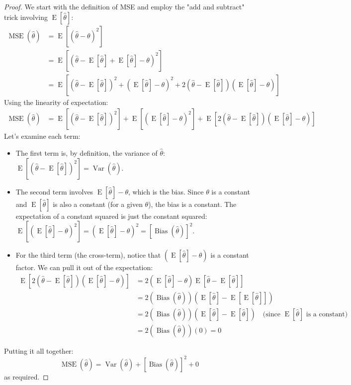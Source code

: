 \documentclass[11pt]{article}
\theoremstyle{mytheoremstyle}
\theoremstyle{mydefinitionstyle}
\DeclareMathOperator{\E}{E}
\DeclareMathOperator{\Var}{Var}
\DeclareMathOperator{\Bias}{Bias}
\DeclareMathOperator{\MSE}{MSE}
\begin{document}
\begin{proof}
We start with the definition of MSE and employ the "add and subtract" trick involving $\E[\hat{\theta}]$:
\begin{align*}
\MSE(\hat{\theta}) &= \E[(\hat{\theta} - \theta)^2] \\
&= \E[(\hat{\theta} - \E[\hat{\theta}] + \E[\hat{\theta}] - \theta)^2] \\
&= \E[ (\hat{\theta} - \E[\hat{\theta}])^2 + (\E[\hat{\theta}] - \theta)^2 + 2 (\hat{\theta} - \E[\hat{\theta}]) (\E[\hat{\theta}] - \theta) ]
\end{align*}
Using the linearity of expectation:
\begin{align*}
\MSE(\hat{\theta}) &= \E[(\hat{\theta} - \E[\hat{\theta}])^2] + \E[(\E[\hat{\theta}] - \theta)^2] + \E[2 (\hat{\theta} - \E[\hat{\theta}]) (\E[\hat{\theta}] - \theta)]
\end{align*}
Let's examine each term:
\begin{itemize}
    \item The first term is, by definition, the variance of $\hat{\theta}$: $\E[(\hat{\theta} - \E[\hat{\theta}])^2] = \Var(\hat{\theta})$.
    \item The second term involves $\E[\hat{\theta}] - \theta$, which is the bias. Since $\theta$ is a constant and $\E[\hat{\theta}]$ is also a constant (for a given $\theta$), the bias is a constant. The expectation of a constant squared is just the constant squared: $\E[(\E[\hat{\theta}] - \theta)^2] = (\E[\hat{\theta}] - \theta)^2 = [\Bias(\hat{\theta})]^2$.
    \item For the third term (the cross-term), notice that $(\E[\hat{\theta}] - \theta)$ is a constant factor. We can pull it out of the expectation:
    \begin{align*}
    \E[2 (\hat{\theta} - \E[\hat{\theta}]) (\E[\hat{\theta}] - \theta)] &= 2 (\E[\hat{\theta}] - \theta) \E[\hat{\theta} - \E[\hat{\theta}]] \\
    &= 2 (\Bias(\hat{\theta})) (\E[\hat{\theta}] - \E[\E[\hat{\theta}]]) \\
    &= 2 (\Bias(\hat{\theta})) (\E[\hat{\theta}] - \E[\hat{\theta}]) \quad \text{(since } \E[\hat{\theta}] \text{ is a constant)} \\
    &= 2 (\Bias(\hat{\theta})) (0) = 0
    \end{align*}
\end{itemize}
Putting it all together:
\begin{equation*}
\MSE(\hat{\theta}) = \Var(\hat{\theta}) + [\Bias(\hat{\theta})]^2 + 0
\end{equation*}
as required.
\end{proof}
\end{document}
